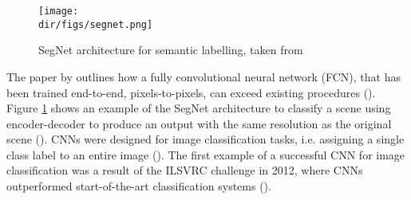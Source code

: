\begin{figure}[htpb]
    \centering
    \texttt{[image: \\dir/figs/segnet.png]}
    \caption{SegNet architecture for semantic labelling, taken from \cite{audebert18}}
    \label{fig.segnet}
\end{figure}
The paper by \cite{long15} outlines how a fully convolutional neural network (FCN), that has been trained end-to-end, pixels-to-pixels, can exceed existing procedures (\cite{shelhamer17}). Figure \ref{fig.segnet} shows an example of the SegNet architecture to classify a scene using encoder-decoder to produce an output with the same resolution as the original scene (\cite{audebert18}). CNNs were designed for image classification tasks, i.e. assigning a single class label to an entire image (\cite{volpi17}). The first example of a successful CNN for image classification was a result of the ILSVRC challenge in 2012, where CNNs outperformed start-of-the-art classification systems (\cite{marmanis16,volpi17,krizhevsky17}).
 


